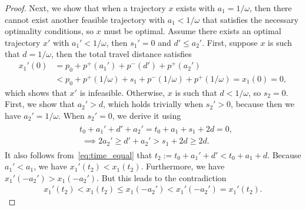 \documentclass[a4paper]{article}
\theoremstyle{definition}
\theoremstyle{plain}
\begin{document}
\begin{proof}
  Next, we show that when a trajectory $x$ exists with $a_{1} = 1/\omega$, then
  there cannot exist another feasible trajectory with $a_{1} < 1/\omega$ that
  satisfies the necessary optimality conditions, so $x$ must be optimal.
  Assume there exists an optimal trajectory $x'$ with $a_{1}' < 1 / \omega$, then
  $s_{1}' = 0$ and $d' \leq a_{2}'$.
  First, suppose $x$ is such that $d = 1/ \omega$, then the total travel distance satisfies
  \begin{align*}
    x_{1}'(0) &= p_{0} + p^{+}(a_{1}') + p^{-}(d') + p^{+}(a_{2}') \\
              &< p_{0} + p^{+}(1/\omega) + s_{1} + p^{-}(1/\omega) + p^{+}(1/\omega) = x_{1}(0) = 0,
  \end{align*}
  which shows that $x'$ is infeasible.
  Otherwise, $x$ is such that $d < 1/\omega$, so $s_{2} = 0$. First, we show that
  $a_{2}' > d$, which holds trivially when $s_{2}' > 0$, because then we have
  $a_{2}' = 1/\omega$. When $s_{2}' = 0$, we derive it using
  \begin{align}
    \begin{split}
    \label{eq:time_equal}
    &t_{0}+ a_{1}' + d' + a_{2}' = t_{0} + a_{1} + s_{1} + 2d = 0 , \\
    &\; \implies 2a_{2}' \geq d' + a_{2}' > s_{1} + 2d \geq 2d .
    \end{split}
  \end{align}
  It also follows from~\eqref{eq:time_equal} that
  $t_{2} := t_{0} + a_{1}' + d' < t_{0} + a_{1} + d$. Because $a_{1}' < a_{1}$,
  we have $x_{1}'(t_{2}) < x_{1}(t_{2})$. Furthermore, we have
  $x_{1}'(-a_{2}') > x_{1}(- a_{2}')$.
  But this leads to the contradiction
  \begin{align}
    \label{eq:contradiction}
    x_{1}'(t_{2}) < x_{1}(t_{2}) \leq x_{1}(-a_{2}') < x_{1}'(- a_{2}') = x_{1}'(t_{2}) .
  \end{align}


\end{proof}
\end{document}

